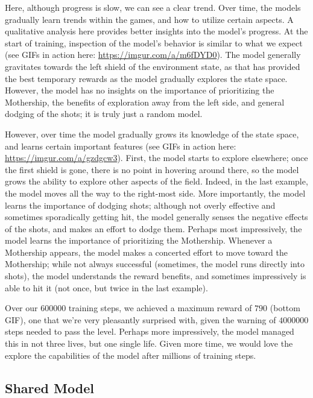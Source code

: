 \documentclass{article} %
\begin{document}
Here, although progress is slow, we can see a clear trend. Over time, the models gradually learn
trends within the games, and how to utilize certain aspects. A qualitative analysis here provides
better insights into the model's progress. At the start of training, inspection of the model's
behavior is similar to what we expect (see GIFs in action here: \url{https://imgur.com/a/m6fDYD0}).
The model generally gravitates towards the left shield of the environment state, as that has
provided the best temporary rewards as the model gradually explores the state space. However, the
model has no insights on the importance of prioritizing the Mothership, the benefits of exploration
away from the left side, and general dodging of the shots; it is truly just a random model.

However, over time the model gradually grows its knowledge of the state space, and learns certain
important features (see GIFs in action here: \url{https://imgur.com/a/gzdgcw3}). First, the model
starts to explore elsewhere; once the first shield is gone, there is no point in hovering around
there, so the model grows the ability to explore other aspects of the field. Indeed, in the last
example, the model moves all the way to the right-most side. More importantly, the model learns the
importance of dodging shots; although not overly effective and sometimes sporadically getting hit,
the model generally senses the negative effects of the shots, and makes an effort to dodge them.
Perhaps most impressively, the model learns the importance of prioritizing the Mothership. Whenever
a Mothership appears, the model makes a concerted effort to move toward the Mothership; while not
always successful (sometimes, the model runs directly into shots), the model understands the reward
benefits, and sometimes impressively is able to hit it (not once, but twice in the last example). 

Over our $600000$ training steps, we achieved a maximum reward of $790$ (bottom GIF), one that we're
very pleasantly surprised with, given the warning of $4000000$ steps needed to pass the level.
Perhaps more impressively, the model managed this in not three lives, but one single life. Given
more time, we would love the explore the capabilities of the model after millions of training steps.

\subsection{Shared Model}
\end{document}
